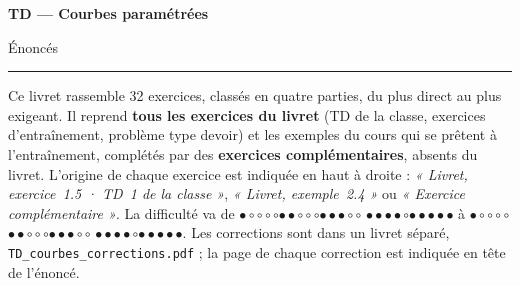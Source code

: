 \documentclass[a4paper,11pt]{article}
\numberwithin{equation}{section}
\numberwithin{figure}{section}
\numberwithin{table}{section}
\theoremstyle{enonce}
\theoremstyle{exemple}
\theoremstyle{remarque}
\newcommand{\niveau}[1]{{\color{Ocre}\footnotesize
  \ifcase#1\or$\bullet\circ\circ\circ\circ$\or$\bullet\bullet\circ\circ\circ$\or$\bullet\bullet\bullet\circ\circ$%
  \or$\bullet\bullet\bullet\bullet\circ$\or$\bullet\bullet\bullet\bullet\bullet$\fi}}
\begin{document}
\thispagestyle{plain}
{\sffamily\small\color{Gris}}\par\vspace{0.2em}
{\sffamily\bfseries\fontsize{26}{30}\selectfont\color{Ink}TD --- Courbes paramétrées}\par\vspace{0.3em}
{\sffamily\Large\color{BleuMoyen}Énoncés}\par\vspace{0.4em}
{\color{Ocre}\rule{3.2cm}{1.4pt}}\par\vspace{0.8em}
{\small Ce livret rassemble 32 exercices, classés en quatre parties, du plus direct au plus exigeant.
Il reprend \textbf{tous les exercices du livret} (TD de la classe, exercices d'entraînement, problème type devoir) et les exemples
du cours qui se prêtent à l'entraînement, complétés par des \textbf{exercices complémentaires}, absents du livret.
L'origine de chaque exercice est indiquée en haut à droite : \emph{« Livret, exercice~1.5 · TD~1 de la classe »}, \emph{« Livret, exemple~2.4 »}
ou \emph{« Exercice complémentaire »}. La difficulté va de \niveau{1} à \niveau{5}.
Les corrections sont dans un livret séparé, \texttt{TD\_courbes\_corrections.pdf} ; la page de chaque correction est indiquée en tête de l'énoncé.}
\end{document}
